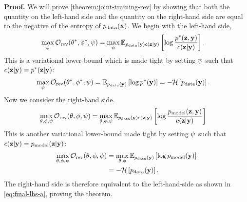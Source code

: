 \textbf{Proof.} We will prove \cref{theorem:joint-training-rev} by showing that
both the quantity on the left-hand side and the quantity on the right-hand side
are equal to the negative of the entropy of $p_{\rm{data}}{}(\mathbf{x}{})$. We begin with the
left-hand side,
\begin{align}
  \max_{\psi{}} \mathcal{O}_\text{rev}({\theta}^*, {\phi}^*, \psi{}) &= \max_{\psi{}} \mathbb{E}_{p_{\rm{data}}{}(\mathbf{y}{})c{}(\mathbf{z}{}|\mathbf{y}{})} \left[ \log\frac{{p}^*{}(\mathbf{z}{},\mathbf{y}{})}{c{}(\mathbf{z}{}|\mathbf{y}{})} \right].
\end{align}
This is a variational lower-bound which is made tight by setting $\psi{}$
such that $c{}(\mathbf{z}{}|\mathbf{y}{}) = {p}^*{}(\mathbf{z}{}|\mathbf{y}{})$:
\begin{align}
  \max_{\psi{}} \mathcal{O}_\text{rev}({\theta}^*, {\phi}^*, \psi{}) &= \mathbb{E}_{p_{\rm{data}}{}(\mathbf{y}{})} \left[ \log {p}^*(\mathbf{y}{}) \right] = - \mathcal{H} \left[ p_{\rm{data}}{}(\mathbf{y}{}) \right]. \label{eq:final-lhs-a}
\end{align}
Now we consider the right-hand side.
\begin{align}
  \max_{\theta, \phi, \psi{}} \mathcal{O}_\text{rev}(\theta, \phi, \psi{}) &= \max_{\theta, \phi, \psi{}} \mathbb{E}_{p_{\rm{data}}{}(\mathbf{y}{})c{}(\mathbf{z}{}|\mathbf{y}{})} \left[ \log\frac{p_{\rm{model}}{}(\mathbf{z}{},\mathbf{y}{})}{c{}(\mathbf{z}{}|\mathbf{y}{})} \right]
\end{align}
This is another variational lower-bound made tight by setting $\psi{}$
such that $c{}(\mathbf{z}{}|\mathbf{y}{}) = p_{\rm{model}}{}(\mathbf{z}{}|\mathbf{y}{})$:
\begin{align}
  \max_{\theta, \phi, \psi{}} \mathcal{O}_\text{rev}(\theta, \phi, \psi{}) &= \max_{\theta, \phi} \mathbb{E}_{p_{\rm{data}}{}(\mathbf{y}{})} \left[ \log p_{\rm{model}}{}(\mathbf{y}{}) \right] \\
                                                                                   &= - \mathcal{H} \left[ p_{\rm{data}}{}(\mathbf{y}{}) \right].
\end{align}
The right-hand side is therefore equivalent to the left-hand-side as shown in
\cref{eq:final-lhs-a}, proving the theorem.



